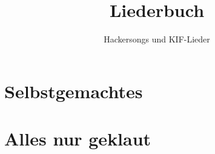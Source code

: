 \documentclass[twoside,12pt]{scrreprt}
\begin{document}
\title{Liederbuch}
\author{Hackersongs und KIF-Lieder}
\maketitle

\tableofcontents


\clearpage



\clearpage


\part{Selbstgemachtes}



\clearpage


\clearpage


\clearpage


\clearpage


\clearpage


\clearpage


\clearpage


\clearpage


\clearpage


\clearpage


\clearpage


\clearpage


\clearpage


\clearpage


\clearpage


\clearpage


\clearpage


\clearpage


\clearpage


\clearpage


\clearpage


\clearpage


\clearpage


\clearpage


\clearpage


\clearpage


\part{Alles nur geklaut}

\clearpage


%

\clearpage


\clearpage


\clearpage

\end{document}
